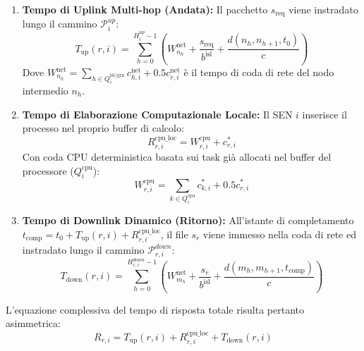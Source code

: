 \documentclass[12pt]{article}
\begin{document}
\begin{enumerate}
    \item \textbf{Tempo di Uplink Multi-hop (Andata):} Il pacchetto $s_{\text{req}}$ viene instradato lungo il cammino $\mathcal{P}_i^{up}$:
    \begin{equation}
    T_{\text{up}}(r,i) = \sum_{h=0}^{H_i^{up} - 1} \left( W_{n_h}^{\text{net}} + \frac{s_{\text{req}}}{b^{\text{isl}}} + \frac{d(n_h, n_{h+1}, t_0)}{c} \right)
    \end{equation}
    Dove $    W_{n_h}^{\text{net}} = \sum_{h \in Q_i^{\text{isl/grn}}} c_{h,i}^{\text{net}} + 0.5 c_{r,i}^{\text{net}}$ \`e il tempo di coda di rete del nodo intermedio $n_h$.
    
    \item \textbf{Tempo di Elaborazione Computazionale Locale:} Il SEN $i$ inserisce il processo nel proprio buffer di calcolo:
    \begin{equation}
    R_{r,i}^{\text{cpu\_loc}} = W_{r,i}^{\text{cpu}} + c_{r,i}^*
    \end{equation}
    Con coda CPU deterministica basata sui task gi\`a allocati nel buffer del processore ($Q_i^{\text{cpu}}$):
    \begin{equation}
    W_{r,i}^{\text{cpu}} = \sum_{k \in Q_i^{\text{cpu}}} c_{k,i}^* + 0.5 c_{r,i}^*
    \end{equation}
    
    \item \textbf{Tempo di Downlink Dinamico (Ritorno):} All'istante di completamento $t_{\text{comp}} = t_0 + T_{\text{up}}(r,i) + R_{r,i}^{\text{cpu\_loc}}$, il file $s_r$ viene immesso nella coda di rete ed instradato lungo il cammino $\mathcal{P}_{r,i}^{down}$:
    \begin{equation}
    T_{\text{down}}(r,i) = \sum_{h=0}^{H_{r,i}^{down} - 1} \left( W_{m_h}^{\text{net}} + \frac{s_r}{b^{\text{isl}}} + \frac{d(m_h, m_{h+1}, t_{\text{comp}})}{c} \right)
    \end{equation}
\end{enumerate}

L'equazione complessiva del tempo di risposta totale risulta pertanto asimmetrica:
\begin{equation}
R_{r,i} = T_{\text{up}}(r,i) + R_{r,i}^{\text{cpu\_loc}} + T_{\text{down}}(r,i)
\end{equation}
\end{document}
